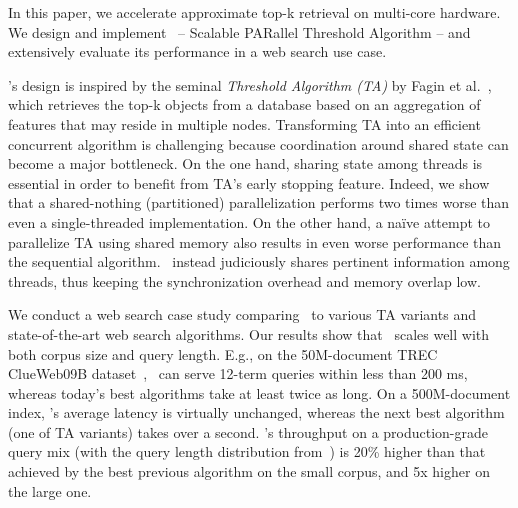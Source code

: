 In this paper, we accelerate approximate top-k retrieval on multi-core hardware. 
We design and implement  \emph{\alg}~-- {Scalable PARallel Threshold Algorithm} --  
 and extensively evaluate its performance in 
a web search use case. 

\alg's design is inspired by the seminal \emph{Threshold Algorithm (TA)} by Fagin et al.~\cite{Fagin:2003}, which
retrieves the top-k objects from a database based on an aggregation of features that may reside in multiple nodes. 
Transforming TA into an efficient concurrent algorithm is challenging because coordination around 
shared state can become a major bottleneck.
On the one hand,
sharing state among threads is essential in order to benefit from TA's early stopping feature.
Indeed, we show  that a shared-nothing (partitioned) parallelization  performs two times 
worse than even a single-threaded implementation. On the other hand, 
a na\"ive attempt to parallelize TA using shared memory also results in even 
worse performance than the sequential algorithm. \alg\ instead judiciously shares pertinent
information among threads, thus keeping the synchronization 
overhead and memory overlap low. 

We conduct a web search case study comparing \alg\ to various TA variants and 
state-of-the-art web search algorithms. 
Our results show that \alg\ scales well with both  corpus size and query length.
E.g., on the 50M-document TREC ClueWeb09B dataset~\cite{ClueWeb09}, 
\alg\ can serve  12-term queries within less than 200 ms, 
whereas today's best algorithms  take at least twice as long.
%
On a 500M-document index,  \alg's average latency is virtually unchanged, whereas the next best algorithm (one of TA variants)
takes over a second. 
 \alg's throughput on a production-grade query mix (with the query length distribution from~\cite{sigir/Guy16}) is 
20\% higher than that achieved by the best previous algorithm on the small corpus, and 5x higher  on the large one.

